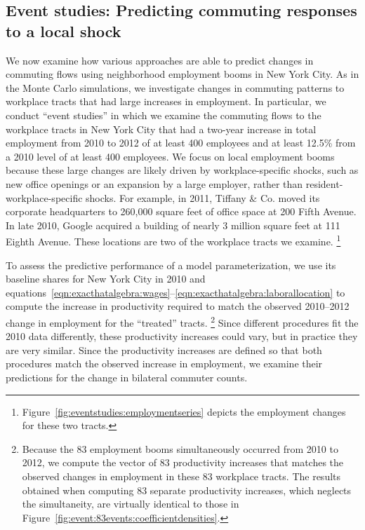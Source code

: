 \documentclass[11pt]{article}
\theoremstyle{definition}
\begin{document}
\subsection{Event studies: Predicting commuting responses to a local shock}\label{sec:ctflgranular:eventstudies}

We now examine how various approaches are able to predict changes in commuting flows using neighborhood employment booms in New York City.
As in the Monte Carlo simulations,
we investigate changes in commuting patterns to workplace tracts that had large increases in employment.
In particular, we conduct ``event studies'' in which we examine the commuting flows to the  workplace tracts in New York City that had
a two-year increase in total employment from 2010 to 2012 of at least 400 employees and at least 12.5\% from a 2010 level of at least 400 employees.
We focus on local employment booms because 
these large changes are likely driven by workplace-specific shocks,
such as new office openings or an expansion by a large employer,
rather than resident-workplace-specific shocks.
For example, in 2011, Tiffany \& Co. moved its corporate headquarters to 260,000 square feet of office space at 200 Fifth Avenue.
In late 2010, Google acquired a building of nearly 3 million square feet at 111 Eighth Avenue.
These locations are two of the  workplace tracts we examine.%
\footnote{Figure~\ref{fig:eventstudies:employmentseries} depicts the employment changes for these two tracts.}

To assess the predictive performance of a model parameterization,
we use its baseline shares for New York City in 2010 and equations~\eqref{eqn:exacthatalgebra:wages}--\eqref{eqn:exacthatalgebra:laborallocation}
to compute the increase in productivity required to match the observed 2010--2012 change in employment for the ``treated'' tracts.%
\footnote{
	Because the 83 employment booms simultaneously occurred from 2010 to 2012,
	we compute the vector of 83 productivity increases that matches the observed changes in employment in these 83 workplace tracts.
	The results obtained when computing 83 separate productivity increases, which neglects the simultaneity, are virtually identical to those in Figure~\ref{fig:event:83events:coefficientdensities}.
}
Since different procedures fit the 2010 data differently, these productivity increases could vary,
but in practice they are very similar.
Since the productivity increases are defined so that both procedures match the observed increase in employment,
we examine their predictions for the change in bilateral commuter counts.
\end{document}
